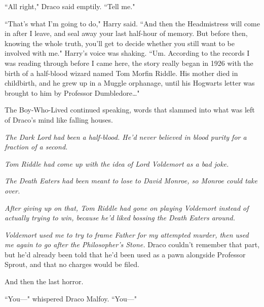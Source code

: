 ``All right," Draco said emptily. ``Tell me."

``That's what I'm going to do," Harry said. ``And then the Headmistress will come in after I leave, and seal away your last half-hour of memory. But before then, knowing the whole truth, you'll get to decide whether you still want to be involved with me." Harry's voice was shaking. ``Um. According to the records I was reading through before I came here, the story really began in 1926 with the birth of a half-blood wizard named Tom Morfin Riddle. His mother died in childbirth, and he grew up in a Muggle orphanage, until his Hogwarts letter was brought to him by Professor Dumbledore{\ldots}"

The Boy-Who-Lived continued speaking, words that slammed into what was left of Draco's mind like falling houses.

\emph{The Dark Lord had been a half-blood. He'd never believed in blood purity for a fraction of a second.}

\emph{Tom Riddle had come up with the idea of Lord Voldemort as a bad joke.}

\emph{The Death Eaters had been meant to lose to David Monroe, so Monroe could take over.}

\emph{After giving up on that, Tom Riddle had gone on playing Voldemort instead of actually trying to win, because he'd liked bossing the Death Eaters around.}

\emph{Voldemort used me to try to frame Father for my attempted murder, then used me again to go after the Philosopher's Stone.} Draco couldn't remember that part, but he'd already been told that he'd been used as a pawn alongside Professor Sprout, and that no charges would be filed.

And then the last horror.

``You—" whispered Draco Malfoy. ``You—"

